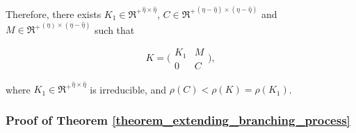 \documentclass{article}
\theoremstyle{definition}
\newcommand{\lrset}[1]{\left\{{#1}\right\}}
\newcommand{\lrp}[1]{\left({#1}\right)}
\begin{document}
 Therefore, there exists $K_1 \in {\Re^+}^{\hat\eta\times\hat\eta}$,  $C\in{\Re^+}^{(\eta-\hat\eta)\times(\eta-\hat\eta)} $ and $M \in {\Re^+}^{(\eta)\times(\eta-\hat\eta)}$ such that 

\[K=\big(\begin{smallmatrix} K_1 & M \\ 0 & C\end{smallmatrix}\big),\]

where $K_1 \in {\Re^+}^{\hat\eta\times\hat\eta} $ is irreducible,  and $\rho(C) < \rho(K)=\rho(K_1)$. 





 \subsubsection{Proof of Theorem \ref{theorem_extending_branching_process}}




 

\end{document}
